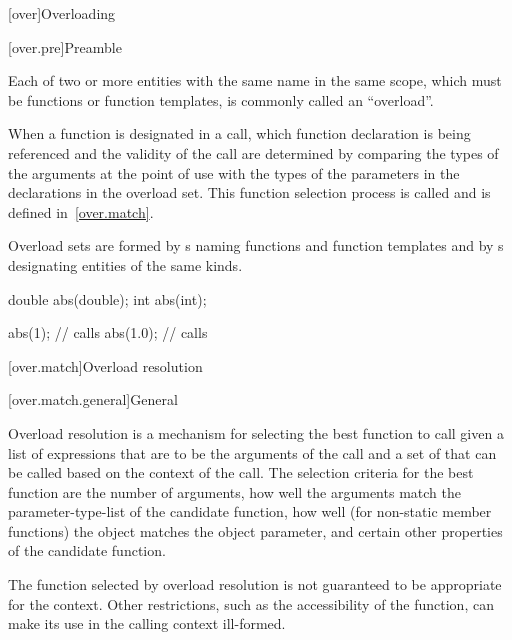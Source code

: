 [over]{Overloading}%


[over.pre]{Preamble}

\pnum
{}%
%
\begin{note}
Each of two or more entities with the same name in the same scope,
which must be functions or function templates,
is commonly called an ``overload''.
\end{note}

\pnum
When a function is designated in a call, which function
declaration is being referenced and the validity of the call
are determined by comparing the types
of the arguments at the point of use with the types of the parameters
in the declarations in the overload set.
This function selection process is called
 and is defined in~\ref{over.match}.
\begin{note}
Overload sets are formed by s
naming functions and function templates and
by s designating entities of the same kinds.
\end{note}
\begin{example}
%
\begin{codeblock}
double abs(double);
int abs(int);

abs(1);             // calls 
abs(1.0);           // calls 
\end{codeblock}
\end{example}

[over.match]{Overload resolution}%

[over.match.general]{General}%
%
%

\pnum
Overload resolution is a mechanism for selecting the best
function to call given a list of expressions that are to be the
arguments of the call and a set of
that can
be called based on the context of the call.
The selection
criteria for the best function are the number of arguments, how
well the arguments match the parameter-type-list of the
candidate function,
how well (for non-static member functions) the object
matches the object parameter,
and certain other properties of the candidate function.
\begin{note}
The function selected by overload resolution is not
guaranteed to be appropriate for the context.
Other restrictions,
such as the accessibility of the function, can make its use in
the calling context ill-formed.
\end{note}

